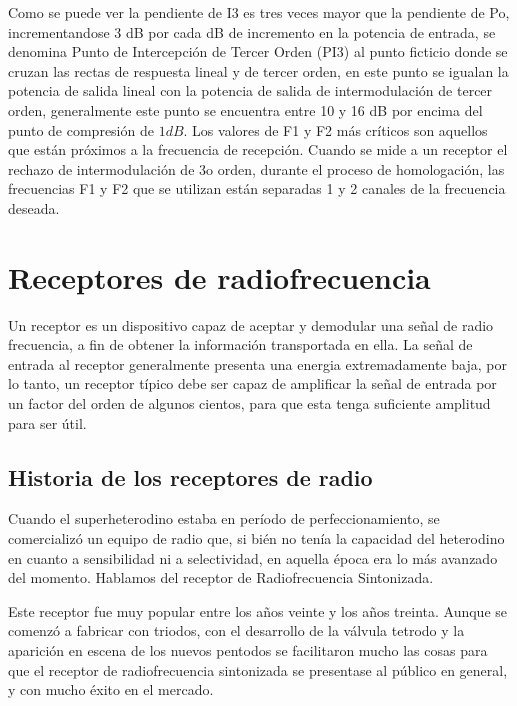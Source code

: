 \documentclass[letterpaper,11pt,spanish]{sphinxmanual}
\let\sphinxpxdimen\pdfpxdimen\else\newdimen\sphinxpxdimen
\begin{document}
\sphinxincludegraphics[width=1067\sphinxpxdimen,height=567\sphinxpxdimen]{{linealidad2}.png}

Como se puede ver la pendiente de I3 es tres veces mayor que la pendiente de Po, incrementandose 3 dB por cada dB de incremento en la potencia de entrada, se denomina Punto de Intercepción de Tercer Orden (PI3) al punto ficticio donde se cruzan las rectas de respuesta lineal y de tercer orden, en este punto se igualan la potencia de salida lineal con la potencia de salida de intermodulación de tercer orden, generalmente este punto se encuentra entre 10 y 16 dB por encima del punto de compresión
de \(1 dB\). Los valores de F1 y F2 más críticos son aquellos que están próximos a la frecuencia de recepción. Cuando se mide a un receptor el rechazo de intermodulación de 3o orden, durante el proceso de homologación, las frecuencias F1 y F2 que se utilizan están separadas 1 y 2 canales de la frecuencia deseada.


\chapter{Receptores de radiofrecuencia}
\label{\detokenize{introduccion/sistemas:Receptores-de-radiofrecuencia}}
Un receptor es un dispositivo capaz de aceptar y demodular una señal de radio frecuencia, a fin de obtener la información transportada en ella. La señal de entrada al receptor generalmente presenta una energia extremadamente baja, por lo tanto, un receptor típico debe ser capaz de amplificar la señal de entrada por un factor del orden de algunos cientos, para que esta tenga suficiente amplitud para ser útil.


\section{Historia de los receptores de radio}
\label{\detokenize{introduccion/sistemas:Historia-de-los-receptores-de-radio}}
Cuando el superheterodino estaba en período de perfeccionamiento, se comercializó un equipo de radio que, si bién no tenía la capacidad del heterodino en cuanto a sensibilidad ni a selectividad, en aquella época era lo más avanzado del momento. Hablamos del receptor de Radiofrecuencia Sintonizada.

Este receptor fue muy popular entre los años veinte y los años treinta. Aunque se comenzó a fabricar con triodos, con el desarrollo de la válvula tetrodo y la aparición en escena de los nuevos pentodos se facilitaron mucho las cosas para que el receptor de radiofrecuencia sintonizada se presentase al público en general, y con mucho éxito en el mercado.
\end{document}
